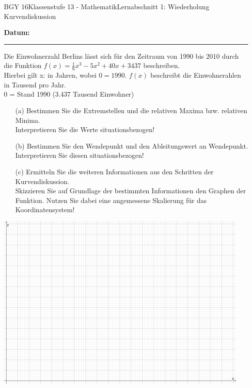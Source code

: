 \documentclass[oneside,openany,headings=optiontotoc,11pt,numbers=noenddot]{scrreprt}
\begin{document}
	\begin{worksheet}{BGY 16}{Klassenstufe 13 - Mathematik}{Lernabschnitt 1: Wiederholung Kurvendiskussion}
				
		\noindent
		\sffamily
		\textbf{Datum:}
		\rule{0.91\textwidth}{0.4pt}
		\begin{framed}
			\noindent
			Die Einwohnerzahl Berlins lässt sich für den Zeitraum von 1990 bis 2010 durch die Funktion \(f(x) = \frac{1}{6}x^3 - 5x^2 +40x +3437\) beschreiben.\\
			Hierbei gilt x: in Jahren, wobei \(0 = 1990\). \(f(x)\) beschreibt die Einwohnerahlen in Tausend pro Jahr.\\
			0 = Stand 1990 (3.437 Tausend Einwohner)
		\end{framed}
		\begin{itemize}
			\item[(a)] Bestimmen Sie die Extremstellen und die relativen Maxima bzw. relativen Minima.\\
			Interpretieren Sie die Werte situationsbezogen!
			\item[(b)] Bestimmen Sie den Wendepunkt und den Ableitungswert an Wendepunkt.\\
			Interpretieren Sie diesen situationsbezogen!
			\item[(c)] Ermitteln Sie die weiteren Informationen aus den Schritten der Kurvendiskussion.\\
			Skizzieren Sie auf Grundlage der bestimmten Informationen den Graphen der Funktion. Nutzen Sie dabei eine angemessene Skalierung für das Koordinatensystem!
		\end{itemize}
		\begin{center}
			\includegraphics[width=0.95\textwidth]{../99_Bilder/00_Wdh/KoordLeer.png}

\end{center}
\end{worksheet}
\end{document}
